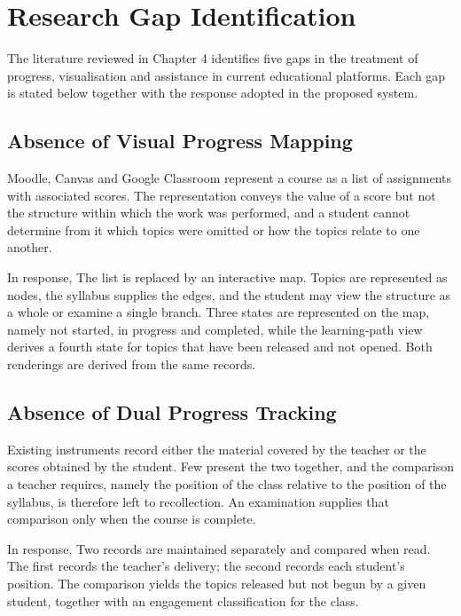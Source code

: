 \chapter{Research Gap Identification}
\label{Research_Gap_Identification}

The literature reviewed in Chapter 4 identifies five gaps in the treatment of progress, visualisation and assistance in current educational platforms. Each gap is stated below together with the response adopted in the proposed system.

\section{Absence of Visual Progress Mapping}

Moodle, Canvas and Google Classroom represent a course as a list of assignments with associated scores. The representation conveys the value of a score but not the structure within which the work was performed, and a student cannot determine from it which topics were omitted or how the topics relate to one another.

In response, The list is replaced by an interactive map. Topics are represented as nodes, the syllabus supplies the edges, and the student may view the structure as a whole or examine a single branch. Three states are represented on the map, namely not started, in progress and completed, while the learning-path view derives a fourth state for topics that have been released and not opened. Both renderings are derived from the same records.

\section{Absence of Dual Progress Tracking}

Existing instruments record either the material covered by the teacher or the scores obtained by the student. Few present the two together, and the comparison a teacher requires, namely the position of the class relative to the position of the syllabus, is therefore left to recollection. An examination supplies that comparison only when the course is complete.

In response, Two records are maintained separately and compared when read. The first records the teacher's delivery; the second records each student's position. The comparison yields the topics released but not begun by a given student, together with an engagement classification for the class.

